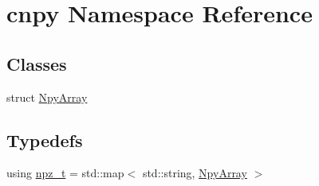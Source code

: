 \hypertarget{namespacecnpy}{}\section{cnpy Namespace Reference}
\label{namespacecnpy}
\subsection*{Classes}
\begin{DoxyCompactItemize}
\item 
struct \hyperlink{structcnpy_1_1_npy_array}{Npy\+Array}
\end{DoxyCompactItemize}
\subsection*{Typedefs}
\begin{DoxyCompactItemize}
\item 
using \hyperlink{namespacecnpy_acfea2d25a7c0e41b79f04864b0a64a2b}{npz\+\_\+t} = std\+::map$<$ std\+::string, \hyperlink{structcnpy_1_1_npy_array}{Npy\+Array} $>$
\end{DoxyCompactItemize}
